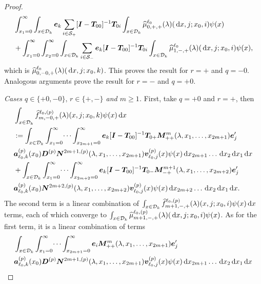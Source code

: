 \begin{proof}
	\begin{align}
		&\int_{x_1=0}^\infty \int_{x\in\mathcal{D}_k} \boldsymbol e_k \sum_{i\in\mathcal{S}_+} [\boldsymbol I - \boldsymbol T_{00}]^{-1}\boldsymbol T_{0i}\int_{x\in\mathcal{D}_k}\widehat{\mu}_{0,+,+}^{\ell_0}(\lambda)(\, \mathrm{d} x,j;x_0,i) \psi(x) \nonumber
		\\& + \int_{x_1=0}^\infty\int_{x_2=0}^\infty \int_{x\in\mathcal{D}_k} \sum_{i\in\mathcal{S}_-}\boldsymbol e_k [\boldsymbol I - \boldsymbol T_{00}]^{-1}\boldsymbol T_{0i}\int_{x\in\mathcal{D}_k}\widehat{\mu}_{1,-,+}^{\ell_0}(\lambda)(\, \mathrm{d} x,j;x_0,i) \psi(x), \label{eqn: thm 1223B}
	\end{align}
	which is \(\widehat{\mu}_{0,-0,+}^{\ell_0}(\lambda)(\, \mathrm{d} x,j;x_0,k)\). This proves the result for \(r=+\) and \(q=-0\). Analogous arguments prove the result for \(r=-\) and \(q=+0\).

	\textit{Cases \(q\in\{+0,-0\},\,r \in \{+,-\}\) and \(m\geq 1\).} First, take \(q=+0\) and \(r=+\), then 
	\begin{align}
		&\int_{x\in\mathcal{D}_k}\widehat{f}_{m,-0,+}^{\ell_0,(p)}(\lambda)(x,j;x_0,k)\psi(x)\, \mathrm{d} x \nonumber 
		\\&:=\int_{x\in\mathcal{D}_k}\int_{x_1=0}^\infty \dots \int_{x_{2m+1}=0}^\infty   \boldsymbol e_k [\boldsymbol I - \boldsymbol T_{00}]^{-1}\boldsymbol T_{0+}\boldsymbol M^m_{++}(\lambda,x_1,\dots,x_{2m+1})\boldsymbol e_j'{} \nonumber
		\\& \boldsymbol a_{\ell_0,k}^{(p)}(x_0) \boldsymbol D^{(p)} \boldsymbol N^{2m+1,(p)}(\lambda,x_1,\dots,x_{2m+1}) {\boldsymbol v}_{\ell_0,j}^{(p)}(x)\psi(x)\, \mathrm{d} x_{2m+1}\dots\, \mathrm{d} x_2 \, \mathrm{d} x_1  \, \mathrm{d} x\nonumber
		\\& + \int_{x\in\mathcal{D}_k}\int_{x_1=0}^\infty \dots \int_{x_{2m+2}=0}^\infty   \boldsymbol e_k [\boldsymbol I - \boldsymbol T_{00}]^{-1}\boldsymbol T_{0-}\boldsymbol M^{m+1}_{-+}(\lambda,x_1,\dots,x_{2m+2})\boldsymbol e_j'{} \nonumber
		\\& \boldsymbol a_{\ell_0,k}^{(p)}(x_0)\boldsymbol N^{2m+2,(p)}(\lambda,x_1,\dots,x_{2m+2}) {\boldsymbol v}_{\ell_0,j}^{(p)}(x)\psi(x)\, \mathrm{d} x_{2m+2}\dots\, \mathrm{d} x_2 \, \mathrm{d} x_1 \, \mathrm{d} x.
	\end{align}
	The second term is a linear combination of \(\int_{x\in\mathcal{D}_k}\widehat{f}_{m+1,-,+}^{\ell_0,(p)}(\lambda)(x,j;x_0,i) \psi(x)\, \mathrm{d} x\) terms, each of which converge to \(\int_{x\in\mathcal{D}_k}\widehat{\mu}_{m+1,-,+}^{\ell_0,(p)}(\lambda)(\, \mathrm{d} x,j;x_0,i) \psi(x)\).
	As for the first term, it is a linear combination of terms 
	\begin{align*}
		&\int_{x\in\calD_k}\int_{x_1=0}^\infty \dots \int_{x_{2m+1}=0}^\infty \bs e_i \bs M^m_{++}(\lambda,x_1,\dots,x_{2m+1})\bs e_j\tr{} \nonumber
		\\& \bs a_{\ell_0,k}^{(p)}(x_0)\bs D^{(p)}\bs N^{2m+1,(p)}(\lambda,x_1,\dots,x_{2m+1}) {\bs v}_{\ell_0,j}^{(p)}(x)\psi(x)\wrt x_{2m+1}\dots\wrt x_2 \wrt x_1 \wrt x

\end{align*}
\end{proof}
